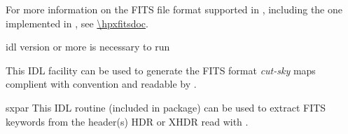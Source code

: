 \begin{codedescription}
{For more information on the FITS file format supported in \healpix, 
including the one implemented in \facname,
see \url{\hpxfitsdoc}.}

\end{codedescription}



\begin{related}
  \begin{sulist}{} %
  \item[idl] version \idlversion or more is necessary to run \facname
  \item[\htmlref{write\_fits\_cut4}{idl:write_fits_cut4}] This \healpix IDL
facility can be used to generate the FITS format {\em cut-sky} maps complient
with \healpix convention and readable by \facname.

    \item[sxpar] This IDL routine (included in \healpix package) can be
  used to extract FITS keywords from the header(s) HDR or XHDR read with \facname.
  \end{sulist}
\end{related}




